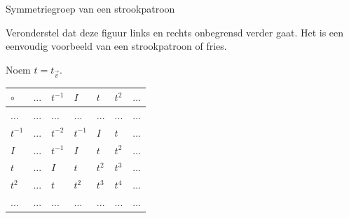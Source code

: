 \begin{lesactiviteit}{Symmetriegroep van een strookpatroon}

Veronderstel dat deze figuur links en rechts onbegrensd verder gaat. Het is een eenvoudig voorbeeld van een strookpatroon of fries.
	
		
\begin{vraagenantwoord}
		
		
	
\end{vraagenantwoord}
		
Noem $t=t_{\overrightarrow{v}}$.
		
\begin{vraagenantwoord}[resume]
	
			
	
		
		
		
	
\begin{center}
		
\begin{tabel}

    \setlength{\extrarowheight}{1.5pt}

		\begin{tabular}{| C{0.8cm} | C{0.8cm}| C{0.8cm}| C{0.8cm} |C{0.8cm}| C{0.8cm} |C{0.8cm} |} 
		\hline
		 $\circ$ & $...$ & $t^{-1}$ & $I$ & $t$ & $t^2$ & $...$ \\
			\hline
 			 $...$ & $...$ & $...$ &$...$ & $...$& $...$ & $...$\\
			 $t^{-1}$ & $...$ & $t^{-2}$ & $t^{-1}$ & $I$ &$t$ &$...$\\
			 $I$ & $...$ & $t^{-1}$ & $I$ & $t$ & $t^2$ & $...$\\
			 $t$ & $...$ & $I$ & $t$ & $t^2$ & $t^3$&$...$\\
			 $t^2$ & $...$ & $t$ &  $t^2$& $t^3$ &$t^4$ &$...$\\
			 $...$ & $...$ & $...$ & $...$ & $...$ & $...$&$...$\\
			\hline
		\end{tabular}		
		

\end{tabel}
\end{center}
\end{vraagenantwoord}
\end{lesactiviteit}
